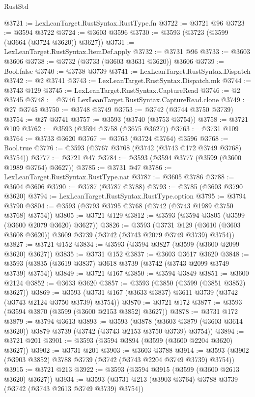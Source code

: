 \begin{lexlean}{RustStd}
\begin{coremodule}
@3721 := LexLeanTarget.RustSyntax.RustType.fn
@3722 := @3721 @96
@3723 := @3594 @3722
@3724 := @3603 @3596
@3730 := @3593 (@3723 (@3599 (@3664 (@3724 @3620)) @3627))
@3731 := LexLeanTarget.RustSyntax.ItemDef.apply
@3732 := @3731 @96
@3733 := @3603 @3606
@3738 := @3732 (@3733 (@3603 @3631 @3620)) @3606
@3739 := Bool.false
@3740 := @3738 @3739
@3741 := LexLeanTarget.RustSyntax.Dispatch
@3742 := @2 @3741
@3743 := LexLeanTarget.RustSyntax.Dispatch.mk
@3744 := @3743 @129
@3745 := LexLeanTarget.RustSyntax.CaptureRead
@3746 := @2 @3745
@3748 := @3746 LexLeanTarget.RustSyntax.CaptureRead.clone
@3749 := @27 @3745
@3750 := @3748 @3749
@3753 := @3742 (@3744 @3750 @3739)
@3754 := @27 @3741
@3757 := @3593 (@3740 (@3753 @3754))
@3758 := @3721 @109
@3762 := @3593 (@3594 @3758 (@3675 @3627))
@3763 := @3731 @109
@3764 := @3733 @3620
@3767 := @3763 (@3724 @3764) @3596
@3768 := Bool.true
@3776 := @3593 (@3767 @3768 (@3742 (@3743 @172 @3749 @3768) @3754))
@3777 := @3721 @47
@3784 := @3593 (@3594 @3777 (@3599 (@3600 @1989 @3764) @3627))
@3785 := @3731 @47
@3786 := LexLeanTarget.RustSyntax.RustType.nat
@3787 := @3605 @3786
@3788 := @3604 @3606
@3790 := @3787 (@3787 @3788)
@3793 := @3785 (@3603 @3790 @3620)
@3794 := LexLeanTarget.RustSyntax.RustType.option
@3795 := @3794 @3790
@3804 := @3593 (@3793 @3795 @3768 (@3742 (@3743 @1989 @3750 @3768) @3754))
@3805 := @3721 @129
@3812 := @3593 (@3594 @3805 (@3599 (@3600 @2079 @3620) @3627))
@3826 := @3593
    (@3731 @129 (@3610 (@3603 @3608 @3620)) @3609 @3739 (@3742 (@3743 @2079 @3749 @3739) @3754))
@3827 := @3721 @152
@3834 := @3593 (@3594 @3827 (@3599 (@3600 @2099 @3620) @3627))
@3835 := @3731 @152
@3837 := @3603 @3617 @3620
@3848 := @3593 (@3835 (@3619 @3837) @3618 @3739 (@3742 (@3743 @2099 @3749 @3739) @3754))
@3849 := @3721 @167
@3850 := @3594 @3849
@3851 := @3600 @2124
@3852 := @3633 @3620
@3857 := @3593 (@3850 (@3599 (@3851 @3852) @3627))
@3869 := @3593 (@3731 @167 (@3633 @3837) @3611 @3739 (@3742 (@3743 @2124 @3750 @3739) @3754))
@3870 := @3721 @172
@3877 := @3593 (@3594 @3870 (@3599 (@3600 @2153 @3852) @3627))
@3878 := @3731 @172
@3879 := @3794 @3613
@3893 := @3593
    (@3878 (@3603 @3879 (@3603 @3614 @3620)) @3879 @3739 (@3742 (@3743 @2153 @3750 @3739) @3754))
@3894 := @3721 @201
@3901 := @3593 (@3594 @3894 (@3599 (@3600 @2204 @3620) @3627))
@3902 := @3731 @201
@3903 := @3603 @3788
@3914 := @3593 (@3902 (@3903 @3852) @3788 @3739 (@3742 (@3743 @2204 @3749 @3739) @3754))
@3915 := @3721 @213
@3922 := @3593 (@3594 @3915 (@3599 (@3600 @2613 @3620) @3627))
@3934 := @3593 (@3731 @213 (@3903 @3764) @3788 @3739 (@3742 (@3743 @2613 @3749 @3739) @3754))

\end{coremodule}
\end{lexlean}
